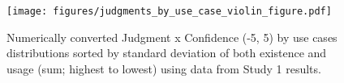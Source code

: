 \begin{figure}[!hptb]
    \centering
    \texttt{[image: figures/judgments\_by\_use\_case\_violin\_figure.pdf]}
    \caption{Numerically converted Judgment x Confidence (-5, 5) by use cases distributions sorted by standard deviation of both existence and usage (sum; highest to lowest) using data from Study 1 results.}
    \label{fig:decisions-by-use-case-violin}
\end{figure}